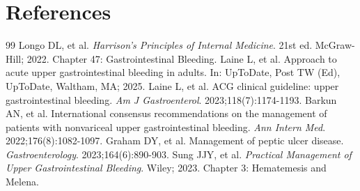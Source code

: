 \section*{References}

\begin{thebibliography}{99}
 Longo DL, et al. \emph{Harrison's Principles of Internal Medicine}. 21st ed. McGraw-Hill; 2022. Chapter 47: Gastrointestinal Bleeding.
 Laine L, et al. Approach to acute upper gastrointestinal bleeding in adults. In: UpToDate, Post TW (Ed), UpToDate, Waltham, MA; 2025.
 Laine L, et al. ACG clinical guideline: upper gastrointestinal bleeding. \emph{Am J Gastroenterol}. 2023;118(7):1174-1193.
 Barkun AN, et al. International consensus recommendations on the management of patients with nonvariceal upper gastrointestinal bleeding. \emph{Ann Intern Med}. 2022;176(8):1082-1097.
 Graham DY, et al. Management of peptic ulcer disease. \emph{Gastroenterology}. 2023;164(6):890-903.
 Sung JJY, et al. \emph{Practical Management of Upper Gastrointestinal Bleeding}. Wiley; 2023. Chapter 3: Hematemesis and Melena.
\end{thebibliography}
